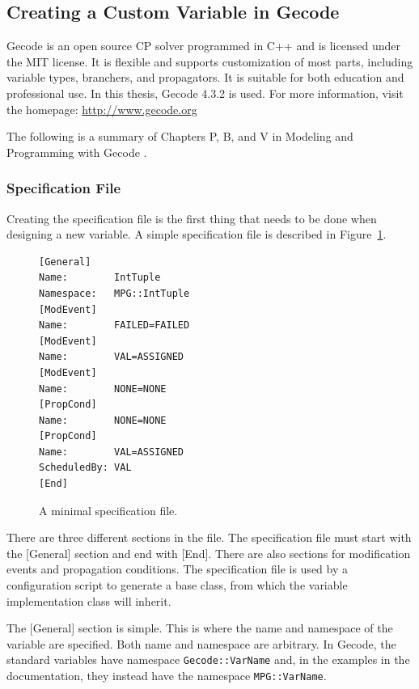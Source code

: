 \documentclass[a4paper,11pt]{article}
\begin{document}
\subsection{Creating a Custom Variable in Gecode}
Gecode is an open source CP solver programmed in C++ and is licensed under the MIT license. It is flexible and supports customization of most parts, including variable types, branchers, and propagators. It is suitable for both education and professional use. In this thesis, Gecode 4.3.2 is used.  For more information, visit the homepage: \url{http://www.gecode.org}

The following is a summary of Chapters P, B, and V in Modeling and Programming with Gecode \cite{mpg}. 

\subsubsection{Specification File}\label{sec:specfile}
Creating the specification file is the first thing that needs to be done when designing a new variable.  A simple specification file is described in Figure~\ref{fig:minimumspecfile}.

\begin{figure}[h]
\begin{minipage}{\linewidth}
\begin{lstlisting}[frame=single]
[General]
Name:        IntTuple
Namespace:   MPG::IntTuple
[ModEvent]
Name:        FAILED=FAILED
[ModEvent]
Name:        VAL=ASSIGNED
[ModEvent]
Name:        NONE=NONE
[PropCond]
Name:        NONE=NONE
[PropCond]
Name:        VAL=ASSIGNED
ScheduledBy: VAL
[End]
\end{lstlisting}
\end{minipage}
\caption{A minimal specification file.}
\label{fig:minimumspecfile}
\end{figure}

There are three different sections in the file. The specification file must start with the [General] section and end with [End]. There are also sections for modification events and propagation conditions. The specification file is used by a configuration script to generate a base class, from which the variable implementation class will inherit.

The [General] section is simple. This is where the name and namespace of the variable are specified. Both name and namespace are arbitrary. In Gecode, the standard variables have namespace \texttt{Gecode::VarName} and, in the examples in the documentation, they instead have the namespace \texttt{MPG::VarName}.
\end{document}
